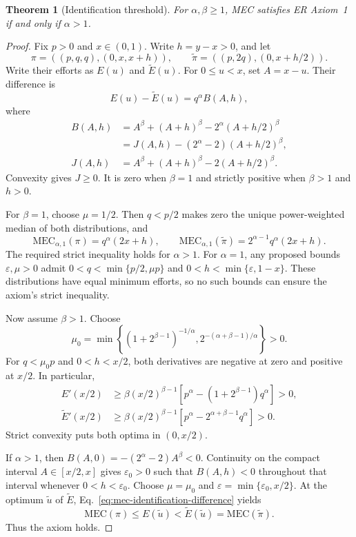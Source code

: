 \documentclass{article}
\theoremstyle{plain}
\newtheorem{theorem}{Theorem}
\theoremstyle{remark}
\begin{document}
\begin{theorem}[Identification threshold]\label{th:mec-er1}
For $\alpha,\beta\geq1$, MEC satisfies ER Axiom~1 if and only if $\alpha>1$.
\end{theorem}
\begin{proof}
Fix $p>0$ and $x\in(0,1)$. Write $h=y-x>0$, and let
\[
\pi=((p,q,q),(0,x,x+h)),\qquad
\widetilde\pi=((p,2q),(0,x+h/2)).
\]
Write their efforts as $E(u)$ and $\widetilde E(u)$. For $0\leq u<x$, set $A=x-u$. Their difference is
\begin{equation}\label{eq:mec-identification-difference}
E(u)-\widetilde E(u)=q^\alpha B(A,h),
\end{equation}
where
\[
\begin{aligned}
B(A,h)
&=A^\beta+(A+h)^\beta-2^\alpha(A+h/2)^\beta\\
&=J(A,h)-(2^\alpha-2)(A+h/2)^\beta,\\
J(A,h)
&=A^\beta+(A+h)^\beta-2(A+h/2)^\beta.
\end{aligned}
\]
Convexity gives $J\geq0$. It is zero when $\beta=1$ and strictly positive when $\beta>1$ and $h>0$.

For $\beta=1$, choose $\mu=1/2$. Then $q<p/2$ makes zero the unique power-weighted median of both distributions, and
\[
\mathrm{MEC}_{\alpha,1}(\pi)=q^\alpha(2x+h),\qquad
\mathrm{MEC}_{\alpha,1}(\widetilde\pi)
=2^{\alpha-1}q^\alpha(2x+h).
\]
The required strict inequality holds for $\alpha>1$. For $\alpha=1$, any proposed bounds $\varepsilon,\mu>0$ admit $0<q<\min\{p/2,\mu p\}$ and $0<h<\min\{\varepsilon,1-x\}$. These distributions have equal minimum efforts, so no such bounds can ensure the axiom's strict inequality.

Now assume $\beta>1$. Choose
\[
\mu_0=\min\left\{
(1+2^{\beta-1})^{-1/\alpha},
2^{-(\alpha+\beta-1)/\alpha}\right\}>0.
\]
For $q<\mu_0p$ and $0<h<x/2$, both derivatives are negative at zero and positive at $x/2$. In particular,
\[
\begin{aligned}
E'(x/2)&\geq\beta(x/2)^{\beta-1}
 [p^\alpha-(1+2^{\beta-1})q^\alpha]>0,\\
\widetilde E'(x/2)&\geq\beta(x/2)^{\beta-1}
 [p^\alpha-2^{\alpha+\beta-1}q^\alpha]>0.
\end{aligned}
\]
Strict convexity puts both optima in $(0,x/2)$.

If $\alpha>1$, then $B(A,0)=-(2^\alpha-2)A^\beta<0$. Continuity on the compact interval $A\in[x/2,x]$ gives $\varepsilon_0>0$ such that $B(A,h)<0$ throughout that interval whenever $0<h<\varepsilon_0$. Choose $\mu=\mu_0$ and $\varepsilon=\min\{\varepsilon_0,x/2\}$. At the optimum $\widetilde u$ of $\widetilde E$, Eq.~\eqref{eq:mec-identification-difference} yields
\[
\mathrm{MEC}(\pi)\leq E(\widetilde u)
<\widetilde E(\widetilde u)=\mathrm{MEC}(\widetilde\pi).
\]
Thus the axiom holds.


\end{proof}
\end{document}
